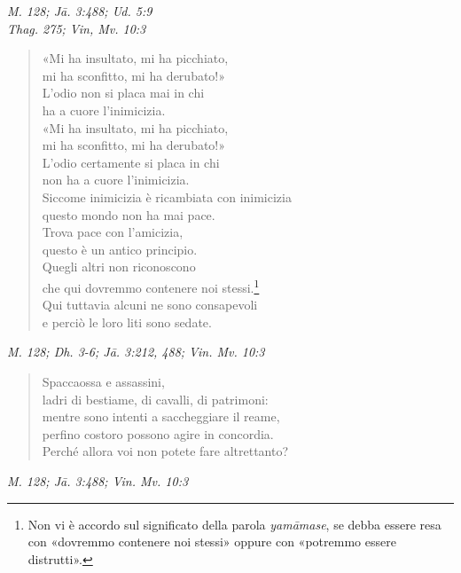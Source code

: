 \emph{M. 128; Jā. 3:488; Ud. 5:9} \\
\emph{Thag. 275; Vin, Mv. 10:3}


\begin{quotation}
«Mi ha insultato, mi ha picchiato, \\
mi ha sconfitto, mi ha derubato!» \\
L’odio non si placa mai in chi \\
ha a cuore l’inimicizia. \\
«Mi ha insultato, mi ha picchiato, \\
mi ha sconfitto, mi ha derubato!» \\
L’odio certamente si placa in chi \\
non ha a cuore l’inimicizia. \\
Siccome inimicizia è ricambiata con inimicizia \\
questo mondo non ha mai pace. \\
Trova pace con l’amicizia, \\
questo è un antico principio. \\
Quegli altri non riconoscono \\
che qui dovremmo contenere noi stessi.\footnote{Non vi è accordo sul significato della parola \emph{yamāmase}, se debba essere resa con «dovremmo contenere noi stessi» oppure con «potremmo essere distrutti».} \\
Qui tuttavia alcuni ne sono consapevoli \\
e perciò le loro liti sono sedate.
\end{quotation}

\emph{M. 128; Dh. 3-6; Jā. 3:212, 488; Vin. Mv. 10:3}


\begin{quotation}
Spaccaossa e assassini, \\
ladri di bestiame, di cavalli, di patrimoni: \\
mentre sono intenti a saccheggiare il reame, \\
perfino costoro possono agire in concordia. \\
Perché allora voi non potete fare altrettanto?
\end{quotation}

\emph{M. 128; Jā. 3:488; Vin. Mv. 10:3}



